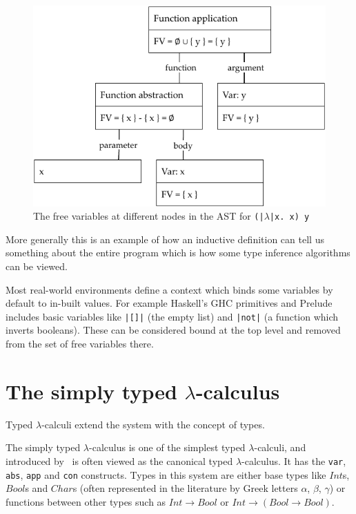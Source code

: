 \documentclass[a4paper,fleqn,oneside,12pt]{report}
\begin{document}
{\centering \begin{figure}[h!]
  \centering
  \includegraphics[width=0.8\linewidth]{images/ast_abs_id_y_fv.pdf}
  \caption{The free variables at different nodes in the AST for \texttt{(|$\lambda$|x. x) y}}
\end{figure} \par}

More generally this is an example of how an inductive definition can tell us something about the entire program which is how some type inference algorithms can be viewed.

Most real-world environments define a context which binds some variables by default to in-built values. For example Haskell’s GHC primitives and Prelude includes basic variables like \texttt{|[]|} (the empty list) and \texttt{|not|} (a function which inverts booleans). These can be considered bound at the top level and removed from the set of free variables there.

\section{The simply typed \texorpdfstring{$\lambda$-}{lambda }calculus}\label{id:h.w7vj0r89b86n}

Typed $\lambda$-calculi extend the system with the concept of types.

The simply typed $\lambda$-calculus is one of the simplest typed $\lambda$-calculi, and introduced by~\cite{ref11} is often viewed as the canonical typed $\lambda$-calculus. It has the \texttt{var}, \texttt{abs}, \texttt{app} and \texttt{con} constructs. Types in this system are either base types like $Int$s, $Bool$s and $Char$s (often represented in the literature by Greek letters $\alpha$, $\beta$, $\gamma$) or functions between other types such as $Int \rightarrow Bool$ or $Int \rightarrow (Bool \rightarrow Bool)$.
\end{document}
